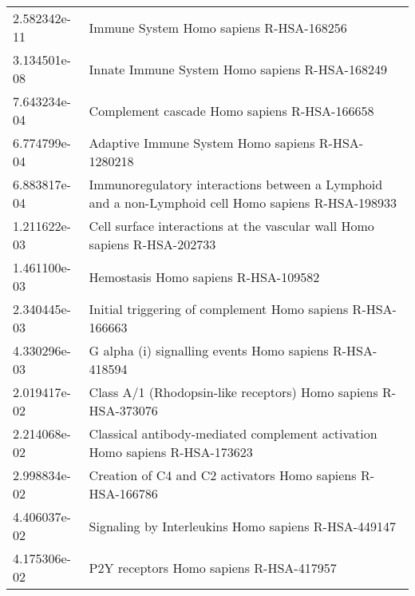 \begin{longtable}{p{2.4cm}p{14.5cm}}
\bottomrule
\endlastfoot
             2.582342e-11 &                                                             Immune System Homo sapiens R-HSA-168256 \\
             3.134501e-08 &                                                      Innate Immune System Homo sapiens R-HSA-168249 \\
             7.643234e-04 &                                                        Complement cascade Homo sapiens R-HSA-166658 \\
             6.774799e-04 &                                                   Adaptive Immune System Homo sapiens R-HSA-1280218 \\
             6.883817e-04 &  Immunoregulatory interactions between a Lymphoid and a non-Lymphoid cell Homo sapiens R-HSA-198933 \\
             1.211622e-03 &                            Cell surface interactions at the vascular wall Homo sapiens R-HSA-202733 \\
             1.461100e-03 &                                                                Hemostasis Homo sapiens R-HSA-109582 \\
             2.340445e-03 &                                          Initial triggering of complement Homo sapiens R-HSA-166663 \\
             4.330296e-03 &                                             G alpha (i) signalling events Homo sapiens R-HSA-418594 \\
             2.019417e-02 &                                      Class A/1 (Rhodopsin-like receptors) Homo sapiens R-HSA-373076 \\
             2.214068e-02 &                         Classical antibody-mediated complement activation Homo sapiens R-HSA-173623 \\
             2.998834e-02 &                                          Creation of C4 and C2 activators Homo sapiens R-HSA-166786 \\
             4.406037e-02 &                                                 Signaling by Interleukins Homo sapiens R-HSA-449147 \\
             4.175306e-02 &                                                             P2Y receptors Homo sapiens R-HSA-417957 \\
\end{longtable}


